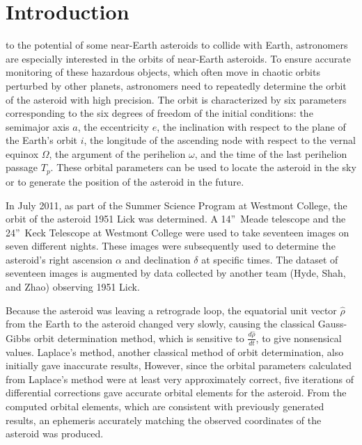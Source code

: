 \documentclass[12pt,journal,compsoc]{IEEEtran}
\begin{document}
\maketitle

\IEEEdisplaynotcompsoctitleabstractindextext
\IEEEpeerreviewmaketitle

\section{Introduction}
to the potential of some near-Earth asteroids to collide with Earth, 
astronomers are especially interested in the orbits of near-Earth asteroids.
To ensure accurate monitoring of these hazardous objects, 
which often move in chaotic orbits perturbed by other planets, 
astronomers need to repeatedly determine the orbit of the asteroid with high precision.  
The orbit is characterized by six parameters
corresponding to the six degrees of freedom of the initial conditions: 
the semimajor axis $a$, 
the eccentricity $e$, 
the inclination with respect to the plane of the Earth's orbit $i$, 
the longitude of the ascending node with respect to the vernal equinox $\Omega$, 
the argument of the perihelion $\omega$, 
and the time of the last perihelion passage $T_p$.  
These orbital parameters can be used to locate the asteroid in the sky or to generate the position of the asteroid in the future.

In July 2011, as part of the Summer Science Program at Westmont College, the orbit of the asteroid 1951 Lick was determined. 
A 14''~Meade telescope and the 24''~Keck Telescope at Westmont College were used to take seventeen images on seven different nights. 
These images were subsequently used to determine the asteroid's right ascension $\alpha$ and declination $\delta$ at specific times.
The dataset of seventeen images is augmented by data collected by another team (Hyde, Shah, and Zhao) observing 1951 Lick.

Because the asteroid was leaving a retrograde loop, 
the equatorial unit vector $\hat{\rho}$ from the Earth to the asteroid changed very slowly, 
causing the classical Gauss-Gibbs orbit determination method, which is sensitive to $\frac{d\hat{\rho}}{dt}$, 
to give nonsensical values.
Laplace's method, 
another classical method of orbit determination, 
also initially gave inaccurate results, 
However, since the orbital parameters calculated from Laplace's method were at least very approximately correct, 
five iterations of differential corrections gave accurate orbital elements for the asteroid.
From the computed orbital elements, which are consistent with previously generated results, 
an ephemeris accurately matching the observed coordinates of the asteroid was produced.
\end{document}

